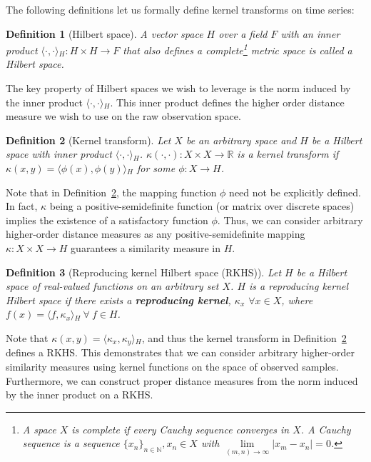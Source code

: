 \documentclass[a4paper]{article}
\newcommand{\innerproduct}[2]{\langle{}#1,#2\rangle{}}
\theoremstyle{def}
\newtheorem{definition}{Definition}
\theoremstyle{thm}
\newcommand{\R}[0]{\mathbb{R}}
\newcommand{\N}[0]{\mathbb{N}}
\begin{document}
The following definitions let us formally define kernel transforms on time series:

\begin{definition}[Hilbert space]\label{defn:hilbert_space}
    A vector space $H$ over a field $F$ with an inner product $\innerproduct{\cdot}{\cdot}_H: H \times H \rightarrow F$ that also defines a complete\footnote{A space $X$ is complete if every Cauchy sequence  converges in $X$. A Cauchy sequence is a sequence $\{x_n\}_{n \in \N}, x_n \in X$ with $\lim\limits_{(m,n)\rightarrow\infty} |x_m - x_n| = 0$.} metric space is called a Hilbert space.
\end{definition}

The key property of Hilbert spaces we wish to leverage is the norm induced by the inner product $\innerproduct{\cdot}{\cdot}_H$.
This inner product defines the higher order distance measure we wish to use on the raw observation space.

\begin{definition}[Kernel transform]\label{defn:kernel_trick}
    Let $X$ be an arbitrary space and $H$ be a Hilbert space with inner product $\innerproduct{\cdot}{\cdot}_H$.
    $\kappa(\cdot, \cdot): X \times X \rightarrow \R$ is a kernel transform if $\kappa(x,y) = \innerproduct{\phi(x)}{\phi(y)}_H$ for some $\phi: X \rightarrow H$.
\end{definition}

Note that in Definition~\ref{defn:kernel_trick}, the mapping function $\phi$ need not be explicitly defined.
In fact, $\kappa$ being a positive-semidefinite function (or matrix over discrete spaces) implies the existence of a satisfactory function $\phi$.
Thus, we can consider arbitrary higher-order distance measures as any positive-semidefinite mapping $\kappa: X \times X \rightarrow H$ guarantees a similarity measure in $H$.

\begin{definition}[Reproducing kernel Hilbert space (RKHS)]\label{defn:rkhs}
    Let $H$ be a Hilbert space of real-valued functions on an arbitrary set $X$.
    $H$ is a reproducing kernel Hilbert space if there exists a \textbf{reproducing kernel}, $\kappa_x$ $\forall x \in X$, where $f(x) = \innerproduct{f}{\kappa_x}_H~\forall~f \in H$.
\end{definition}

Note that $\kappa(x,y) = \innerproduct{\kappa_x}{\kappa_y}_H$, and thus the kernel transform in Definition~\ref{defn:kernel_trick} defines a RKHS.
This demonstrates that we can consider arbitrary higher-order similarity measures using kernel functions on the space of observed samples.
Furthermore, we can construct proper distance measures from the norm induced by the inner product on a RKHS.
\end{document}
